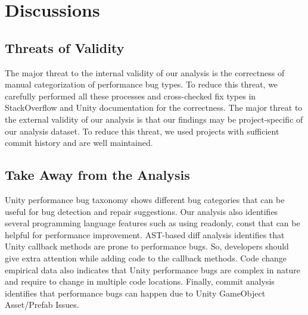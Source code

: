 \chapter{Discussions}
\label{chap:discussions}
\section{Threats of Validity}
\label{sec:threats}
The major threat to the internal validity of our analysis is the correctness of manual categorization of performance bug types. To reduce this threat, we carefully performed all these processes and cross-checked fix types in StackOverflow and Unity documentation for the correctness. The major threat to the external validity of our analysis is that our findings may be project-specific of our analysis dataset. To reduce this threat, we used projects with sufficient commit history and are well maintained.


\section{Take Away from the Analysis}
\label{sec:takeway}
Unity performance bug taxonomy shows different bug categories that can be useful for bug detection and repair suggestions. Our analysis also identifies several programming language features such as using readonly, const that can be helpful for performance improvement. AST-based diff analysis identifies that Unity callback methods are prone to performance bugs. So, developers should give extra attention while adding code to the callback methods. Code change empirical data also indicates that Unity performance bugs are complex in nature and require to change in multiple code locations. Finally, commit analysis identifies that performance bugs can happen due to Unity GameObject Asset/Prefab Issues. 



